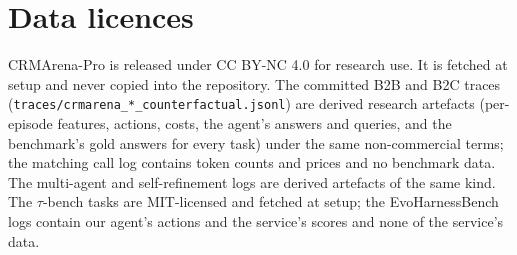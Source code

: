 \documentclass[10pt]{article}
\newcommand{\code}[1]{\texttt{#1}}
\begin{document}
\section{Data licences}
\label{app:license}

CRMArena-Pro is released under CC BY-NC 4.0 for research use. It is fetched at setup and never copied into the repository. The committed B2B and B2C traces (\code{traces/crmarena\_*\_counterfactual.jsonl}) are derived research artefacts (per-episode features, actions, costs, the agent's answers and queries, and the benchmark's gold answers for every task) under the same non-commercial terms; the matching call log contains token counts and prices and no benchmark data. The multi-agent and self-refinement logs are derived artefacts of the same kind. The $\tau$-bench tasks are MIT-licensed and fetched at setup; the EvoHarnessBench logs contain our agent's actions and the service's scores and none of the service's data.
\end{document}
